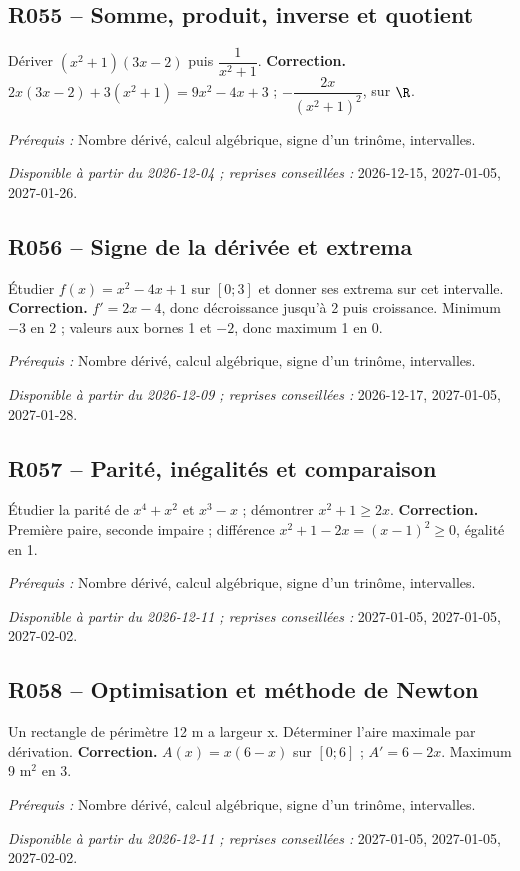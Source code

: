 \subsection*{R055 -- Somme, produit, inverse et quotient}\label{R055}
Dériver $(x^2+1)(3x-2)$ puis $\dfrac{1}{x^2+1}$.
\ifprof\textbf{Correction.} $2x(3x-2)+3(x^2+1)=9x^2-4x+3$ ; $-\dfrac{2x}{(x^2+1)^2}$, sur $\R$.\par\textit{Prérequis :} Nombre dérivé, calcul algébrique, signe d’un trinôme, intervalles.\par\textit{Disponible à partir du 2026-12-04 ; reprises conseillées :} 2026-12-15, 2027-01-05, 2027-01-26.\fi
{}\subsection*{R056 -- Signe de la dérivée et extrema}\label{R056}
Étudier $f(x)=x^2-4x+1$ sur $[0;3]$ et donner ses extrema sur cet intervalle.
\ifprof\textbf{Correction.} $f\prime=2x-4$, donc décroissance jusqu’à 2 puis croissance. Minimum $-3$ en 2 ; valeurs aux bornes 1 et $-2$, donc maximum 1 en 0.\par\textit{Prérequis :} Nombre dérivé, calcul algébrique, signe d’un trinôme, intervalles.\par\textit{Disponible à partir du 2026-12-09 ; reprises conseillées :} 2026-12-17, 2027-01-05, 2027-01-28.\fi
{}\subsection*{R057 -- Parité, inégalités et comparaison}\label{R057}
Étudier la parité de $x^4+x^2$ et $x^3-x$ ; démontrer $x^2+1\geq2x$.
\ifprof\textbf{Correction.} Première paire, seconde impaire ; différence $x^2+1-2x=(x-1)^2\geq0$, égalité en 1.\par\textit{Prérequis :} Nombre dérivé, calcul algébrique, signe d’un trinôme, intervalles.\par\textit{Disponible à partir du 2026-12-11 ; reprises conseillées :} 2027-01-05, 2027-01-05, 2027-02-02.\fi
{}\subsection*{R058 -- Optimisation et méthode de Newton}\label{R058}
Un rectangle de périmètre 12 m a largeur x. Déterminer l’aire maximale par dérivation.
\ifprof\textbf{Correction.} $A(x)=x(6-x)$ sur $[0;6]$ ; $A\prime=6-2x$. Maximum 9 m$^2$ en 3.\par\textit{Prérequis :} Nombre dérivé, calcul algébrique, signe d’un trinôme, intervalles.\par\textit{Disponible à partir du 2026-12-11 ; reprises conseillées :} 2027-01-05, 2027-01-05, 2027-02-02.\fi
